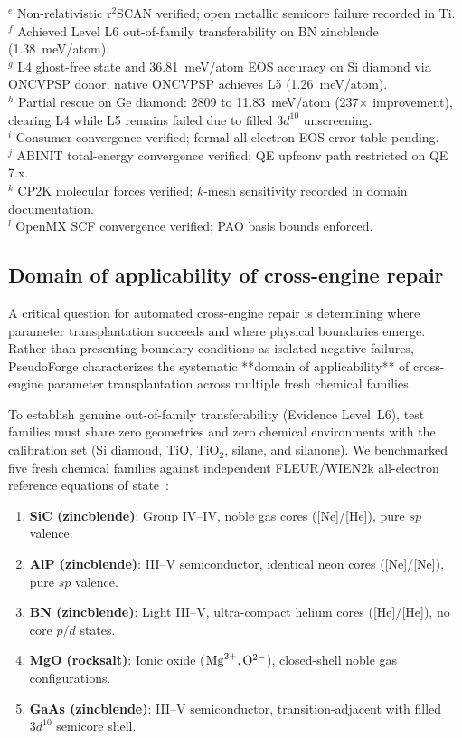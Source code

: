 \documentclass[3p,twocolumn]{elsarticle}
\begin{document}
\begin{table}[t]
$^e$ Non-relativistic r$^2$SCAN verified; open metallic semicore failure recorded in Ti.\\
$^f$ Achieved Level L6 out-of-family transferability on BN zincblende (1.38~meV/atom).\\
$^g$ L4 ghost-free state and 36.81~meV/atom EOS accuracy on Si diamond via ONCVPSP donor; native ONCVPSP achieves L5 (1.26~meV/atom).\\
$^h$ Partial rescue on Ge diamond: 2809 to 11.83~meV/atom (237$\times$ improvement), clearing L4 while L5 remains failed due to filled $3d^{10}$ unscreening.\\
$^i$ Consumer convergence verified; formal all-electron EOS error table pending.\\
$^j$ ABINIT total-energy convergence verified; QE upfconv path restricted on QE 7.x.\\
$^k$ CP2K molecular forces verified; $k$-mesh sensitivity recorded in domain documentation.\\
$^l$ OpenMX SCF convergence verified; PAO basis bounds enforced.
\end{table}

\subsection{Domain of applicability of cross-engine repair}

A critical question for automated cross-engine repair is determining where parameter transplantation succeeds and where physical boundaries emerge. Rather than presenting boundary conditions as isolated negative failures, PseudoForge characterizes the systematic **domain of applicability** of cross-engine parameter transplantation across multiple fresh chemical families.

To establish genuine out-of-family transferability (Evidence Level~L6), test families must share zero geometries and zero chemical environments with the calibration set (Si diamond, TiO, TiO$_2$, silane, and silanone). We benchmarked five fresh chemical families against independent FLEUR/WIEN2k all-electron reference equations of state~\cite{tran2016,bosoni2024}:
\begin{enumerate}\setlength{\itemsep}{1pt}\setlength{\parskip}{0pt}
\item \textbf{SiC (zincblende)}: Group IV--IV, noble gas cores ([Ne]/[He]), pure $sp$ valence.
\item \textbf{AlP (zincblende)}: III--V semiconductor, identical neon cores ([Ne]/[Ne]), pure $sp$ valence.
\item \textbf{BN (zincblende)}: Light III--V, ultra-compact helium cores ([He]/[He]), no core $p/d$ states.
\item \textbf{MgO (rocksalt)}: Ionic oxide (${\rm Mg}^{2+}, {\rm O}^{2-}$), closed-shell noble gas configurations.
\item \textbf{GaAs (zincblende)}: III--V semiconductor, transition-adjacent with filled $3d^{10}$ semicore shell.
\end{enumerate}
\end{document}
